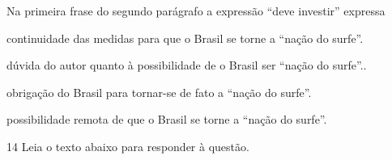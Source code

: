 Na primeira frase do segundo parágrafo a expressão ``deve investir'' expressa

\begin{escolha}

    \item continuidade das medidas para que o Brasil se torne a ``nação do surfe''.

    \item dúvida do autor quanto à possibilidade de o Brasil ser ``nação do surfe''..

    \item obrigação do Brasil para tornar-se de fato a ``nação do surfe''.

    \item possibilidade remota de que o Brasil se torne a ``nação do surfe''.

\end{escolha}

\num{14} Leia o texto abaixo para responder à questão. 

